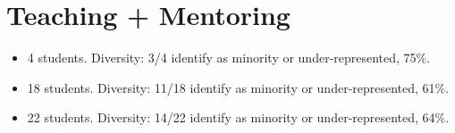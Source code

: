 \documentclass[letterpaper]{deedy-resume} %
\begin{document}
{%

%
%
%
%
%
%
%  
%  
%
%
%
%
%


\section{Teaching + Mentoring}

\vspace{0.2cm}

\begin{itemize}

\item {{} 4 students. Diversity: 3/4 identify as minority or under-represented, 75\%.}

\item {{} 18 students. Diversity: 11/18 identify as minority or under-represented, 61\%.}

\item {{} 22 students. Diversity: 14/22 identify as minority or under-represented, 64\%.}


\end{itemize}}
\end{document}
